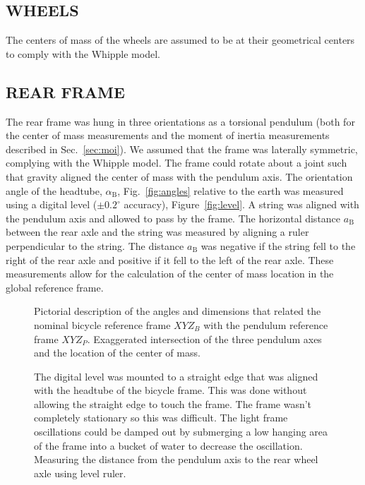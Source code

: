 \documentclass{bmd2010p}
\begin{document}
\subsection{WHEELS}
The centers of mass of the wheels are assumed to be at their geometrical
centers to comply with the Whipple model.
\subsection{REAR FRAME}
The rear frame was hung in three orientations as a torsional pendulum (both for
the center of mass measurements and the moment of inertia measurements
described in Sec.~\ref{sec:moi}). We assumed that the frame was laterally
symmetric, complying with the Whipple model. The frame could rotate about a joint
such that gravity aligned the center of mass with the pendulum axis. The
orientation angle of the headtube, $\alpha_\mathrm{B}$, Fig.~\ref{fig:angles} relative
to the earth was measured using a digital level ($\pm0.2^{\circ}$ accuracy),
Figure~\ref{fig:level}. A string was aligned with the pendulum axis
and allowed to pass by the frame. The horizontal distance $a_\mathrm{B}$ between the rear
axle and the string was measured by aligning a ruler perpendicular to
the string. The distance $a_\mathrm{B}$ was negative if the string fell to the right of
the rear axle and positive if it fell to the left of the rear axle. These
measurements allow for the calculation of the center of mass location in the
global reference frame.
\begin{figure}[tbp]
    \centering
    \caption{ Pictorial description of the angles and dimensions that related
    the nominal bicycle reference frame $XYZ_B$ with the pendulum reference frame
    $XYZ_P$.  Exaggerated intersection of the three pendulum axes and the
    location of the center of mass.}
\end{figure}
\begin{figure}[tbp]
    \centering
    \quad
    \caption{ The digital level was mounted to a straight edge that was aligned
    with the headtube of the bicycle frame. This was done without allowing the
    straight edge to touch the frame. The frame wasn't completely stationary so
    this was difficult. The light frame oscillations could be damped out by
    submerging a low hanging area of the frame into a bucket of water to
    decrease the oscillation.  Measuring the distance from
    the pendulum axis to the rear wheel axle using level ruler.}
\end{figure}
\end{document}
